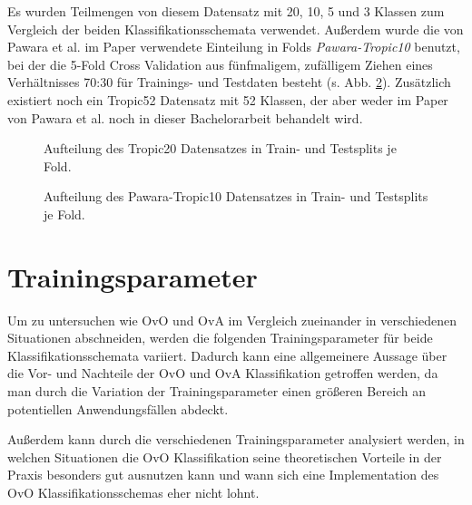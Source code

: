Es wurden Teilmengen von diesem Datensatz mit 20, 10, 5 und 3 Klassen zum Vergleich der beiden Klassifikationsschemata verwendet. Außerdem wurde die von Pawara et al. im Paper \cite{pawaraPaper} verwendete Einteilung in Folds \textit{Pawara-Tropic10} \cite{pawaraWebsiteDatensaetze} benutzt, bei der die 5-Fold Cross Validation aus fünfmaligem, zufälligem Ziehen eines Verhältnisses 70:30 für Trainings- und Testdaten besteht (s. Abb. \ref{fig:pawaraTropic10Zusammensetzung}).
Zusätzlich existiert noch ein Tropic52 Datensatz \cite{pawaraWebsiteDatensaetze} mit 52 Klassen, der aber weder im Paper von Pawara et al. \cite{pawaraPaper} noch in dieser Bachelorarbeit behandelt wird.

\begin{figure}[H]
\begin{adjustbox}{width=1.2\textwidth, center}

\end{adjustbox}
\caption{Aufteilung des Tropic20 Datensatzes \cite{pawaraWebsiteDatensaetze} in Train- und Testsplits je Fold.}
\label{fig:tropic20Zusammensetzung}
\end{figure}
\begin{figure}[H]
\begin{adjustbox}{width=1.2\textwidth, center}

\end{adjustbox}
\caption{Aufteilung des Pawara-Tropic10 Datensatzes \cite{pawaraWebsiteDatensaetze} in Train- und Testsplits je Fold.}
\label{fig:pawaraTropic10Zusammensetzung}
\end{figure}


\section{Trainingsparameter}
\label{ch:methodik_parameter}
Um zu untersuchen wie OvO und OvA im Vergleich zueinander in verschiedenen Situationen abschneiden, werden die folgenden Trainingsparameter für beide Klassifikationsschemata variiert.
Dadurch kann eine allgemeinere Aussage über die Vor- und Nachteile der OvO und OvA Klassifikation getroffen werden, da man durch die Variation der Trainingsparameter einen größeren Bereich an potentiellen Anwendungsfällen abdeckt.

Außerdem kann durch die verschiedenen Trainingsparameter analysiert werden, in welchen Situationen die OvO Klassifikation seine theoretischen Vorteile in der Praxis besonders gut ausnutzen kann und wann sich eine Implementation des OvO Klassifikationsschemas eher nicht lohnt.


